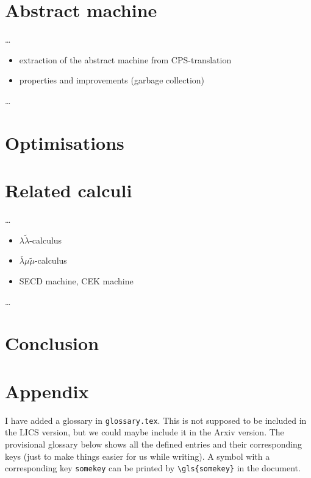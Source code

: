 \documentclass[a4paper,UKenglish,cleveref,thm-restate]{lipics-v2021}
\begin{document}
\section{Abstract machine}
\dots
\begin{itemize}
  \item extraction of the abstract machine from CPS-translation
  \item properties and improvements (garbage collection)
\end{itemize}
\dots

\section{Optimisations}

\section{Related calculi}

\dots
\begin{itemize}
  \item $\lambda\widetilde{\lambda}$-calculus \cite{choudhuryDualityLAbstraction2025}
  \item $\bar{\lambda}\mu\widetilde{\mu}$-calculus \cite{curienDualityComputation2000}
  \item SECD machine\cite{landinMechanicalEvaluationExpressions1964a}, CEK machine \cite{felleisenControlOperatorsSECDmachine1986}
\end{itemize}
\dots

\section{Conclusion}



\clearpage
\appendix

\section{Appendix}
I have added a glossary in \verb+glossary.tex+.
This is not supposed to be included in the LICS version, but we could maybe include it in the Arxiv version.
The provisional glossary below shows all the defined entries and their corresponding keys (just to make things easier for us while writing).
A symbol with a corresponding key \texttt{somekey} can be printed by \verb+\gls{somekey}+ in the document.

\glsaddall
\printglossary[type=symbols, title={Glossary}, style={long-symbols}]
\end{document}
